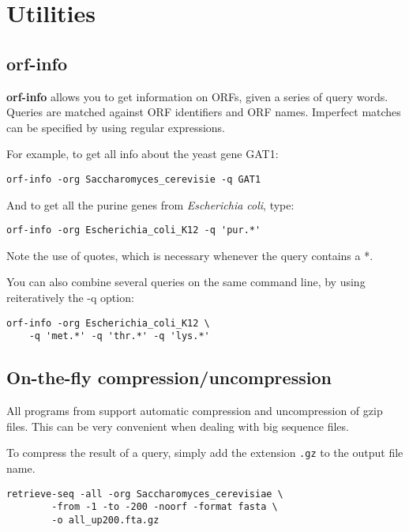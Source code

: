 \section{Utilities}

\subsection{orf-info}

\textbf{orf-info} allows you to get information on ORFs, given a series of
query words. Queries are matched against ORF identifiers and ORF
names. Imperfect matches can be specified by using regular
expressions.

For example, to get all info about the yeast gene GAT1:

\begin{verbatim}
orf-info -org Saccharomyces_cerevisie -q GAT1
\end{verbatim}

And to get all the purine genes from \textit{Escherichia coli}, type: 

\begin{verbatim}
orf-info -org Escherichia_coli_K12 -q 'pur.*'
\end{verbatim}

Note the use of quotes, which is necessary whenever the query contains
a *.

You can also combine several queries on the same command line, by
using reiteratively the -q option:

\begin{verbatim}
orf-info -org Escherichia_coli_K12 \
    -q 'met.*' -q 'thr.*' -q 'lys.*'
\end{verbatim}

\subsection{On-the-fly compression/uncompression}
All programs from \RSAT support automatic compression and
uncompression of gzip files. This can be very convenient when dealing
with big sequence files.

To compress the result of a query, simply add the extension
\texttt{.gz} to the output file name.

\begin{verbatim}
retrieve-seq -all -org Saccharomyces_cerevisiae \
        -from -1 -to -200 -noorf -format fasta \
        -o all_up200.fta.gz
\end{verbatim}

